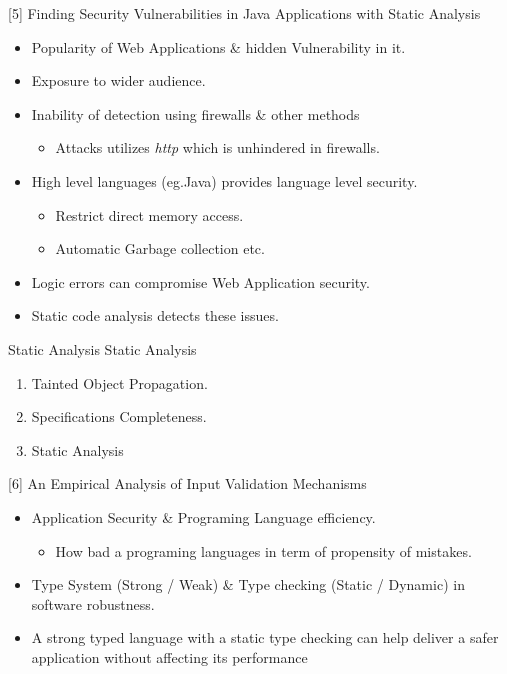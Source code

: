 \documentclass[xcolor=x11names,compress]{beamer}
\renewcommand{\(}{\begin{columns}}
\renewcommand{\)}{\end{columns}}
\newcommand{\<}[1]{\begin{column}{#1}}
\renewcommand{\>}{\end{column}}
\begin{document}
\begin{frame}{[5] Finding Security Vulnerabilities in Java Applications with
		Static Analysis}
	\begin{itemize}
		\item Popularity of Web Applications \& hidden Vulnerability in it.
		\item Exposure to wider audience.
		\item Inability of detection using firewalls \& other methods
		\begin{itemize}
			\item Attacks utilizes \textit{http} which is unhindered in firewalls.
		\end{itemize}
		\item High level languages (eg.Java) provides language level security.
		\begin{itemize}
			\item Restrict direct memory access.
			\item Automatic Garbage collection etc.
		\end{itemize}
		\item Logic errors can compromise Web Application security.
		\item Static code analysis detects these issues. 
	\end{itemize}
\end{frame}

\begin{frame}{Static Analysis}
	\large
	Static Analysis
	\begin{enumerate}
		\item Tainted Object Propagation.\newline
		\item Specifications Completeness. \newline
		\item Static Analysis
	\end{enumerate}
\end{frame}
\begin{frame}{[6] An Empirical Analysis of Input Validation Mechanisms}
	\begin{itemize}
		\item Application Security \& Programing Language efficiency.
		\newline
		\begin{itemize}
			\item How bad a programing languages in term of propensity of mistakes.\newline
		\end{itemize}
		\item Type System (Strong / Weak) \& Type checking (Static / Dynamic) in software robustness.
		\newline
		\item A strong typed language with a
		static type checking can help deliver a safer application without affecting its performance
	\end{itemize}
\end{frame}
\end{document}

